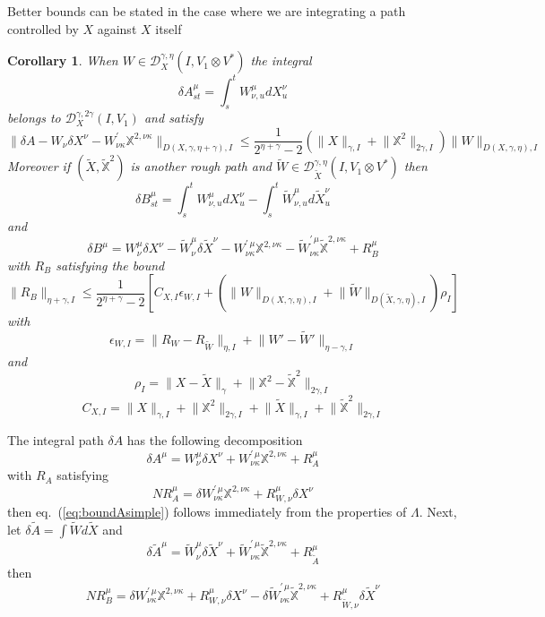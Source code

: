 \documentclass[a4paper,12pt,reqno]{amsproc}
\newcommand{\der}{\delta\!}
\newcommand{\NN}{N}
\newcommand{\DD}{\mathcal{D}}
\newcommand{\norm}[1]{\lVert #1\rVert}
\newcommand{\wt}{\widetilde}
\newtheorem{corollary}{Corollary}
\begin{document}
Better bounds can be stated in the case where we are integrating a
path controlled by $X$ against $X$ itself 
\begin{corollary}
\label{cor:betterbounds}
When $W \in \DD_X^{\gamma,\eta}(I,V_1 \otimes V^*)$ the integral
$$
\der A^\mu_{st} = \int_s^t W^\mu_{\nu,u} dX^\nu_u
$$  
belongs to $\DD_{X}^{\gamma,2\gamma}(I,V_1)$ and satisfy
\begin{equation}
\label{eq:boundAsimple}
\norm{\der A - W_\nu \der X^\nu - W^{\prime}_{\nu\kappa}
  \mathbb{X}^{2,\nu\kappa}}_{D(X,\gamma,\eta+\gamma),I} \le
\frac{1}{2^{\eta+\gamma}-2}
(\norm{X}_{\gamma,I}+\norm{\mathbb{X}^2}_{2\gamma,I}) \norm{W}_{D(X,\gamma,\eta),I}  
\end{equation}
Moreover if $(\wt X, \mathbb{\wt X}^2)$ is another rough path and $\wt
W \in \DD_{\wt X}^{\gamma,\eta}(I,V_1\otimes V^*)$ then
$$
\der B^\mu_{st} =  \int_s^t W^\mu_{\nu,u} dX^\nu_u -  \int_s^t \wt W^\mu_{\nu,u} d\wt X^\nu_u
$$
and
$$
\der B^\mu = W^\mu_\nu \der X^\nu - \wt W^\mu_\nu \der \wt X^\nu - W^{\prime\,\mu}_{\nu\kappa} \mathbb{ X}^{2,\nu\kappa} - \wt W^{\prime\,\mu}_{\nu\kappa}
\mathbb{ \wt X}^{2,\nu\kappa} + R^\mu_{B}
$$
with  $R_B$
satisfying the bound
\begin{equation}
\label{eq:betterbound-difference}
\norm{R_B}_{\eta+\gamma,I} \le \frac{1}{2^{\eta+\gamma}-2}\left[
C_{X,I} \epsilon_{W,I} +
(\norm{W}_{D(X,\gamma,\eta),I}+\norm{\wt
  W}_{D(\wt X,\gamma,\eta),I}) \rho_I \right]
\end{equation}
with
$$
\epsilon_{W,I} = \norm{ R_W - R_{\wt W}}_{\eta,I} + \norm{W'-\wt W'}_{\eta-\gamma,I}
$$
and
$$
\rho_I = \norm{X-\wt X}_{\gamma} + \norm{\mathbb{X}^2-\mathbb{\wt X}^2}_{2\gamma,I} 
$$
$$
C_{X,I} =
 \norm{X}_{\gamma,I}+\norm{\mathbb{X}^2}_{2\gamma,I}+
 \norm{\wt X}_{\gamma,I}+\norm{\mathbb{\wt X}^2}_{2\gamma,I} 
$$
\end{corollary}
\proof
The integral path $\der A$ has the following decomposition
$$
\der A^\mu = W^\mu_\nu \der X^\nu + W^{\prime\,\mu}_{\nu\kappa} \mathbb{X}^{2,\nu\kappa} + R^\mu_A
$$
with $R_A$ satisfying
$$
\NN R_A^\mu = \der W^{\prime\,\mu}_{\nu\kappa} \mathbb{X}^{2,\nu\kappa} + R^\mu_{W,\nu} \der X^\nu
$$
then eq.~(\ref{eq:boundAsimple}) follows immediately from the
properties of $\Lambda$. Next, let $\der \wt A = \int \wt W d \wt X$
and
$$
\der \wt A^\mu = \wt W^\mu_\nu \der \wt X^\nu + \wt
W^{\prime\,\mu}_{\nu\kappa} \mathbb{\wt X}^{2,\nu\kappa} + R^\mu_{\wt A}
$$
then
$$
\NN R^\mu_B = \der W^{\prime\,\mu}_{\nu\kappa} \mathbb{X}^{2,\nu\kappa} +
R^\mu_{W,\nu} \der X^\nu - \der \wt W^{\prime\,\mu}_{\nu\kappa}
\mathbb{\wt X}^{2,\nu\kappa} + R^\mu_{\wt W,\nu} \der \wt X^\nu
$$
\end{document}
